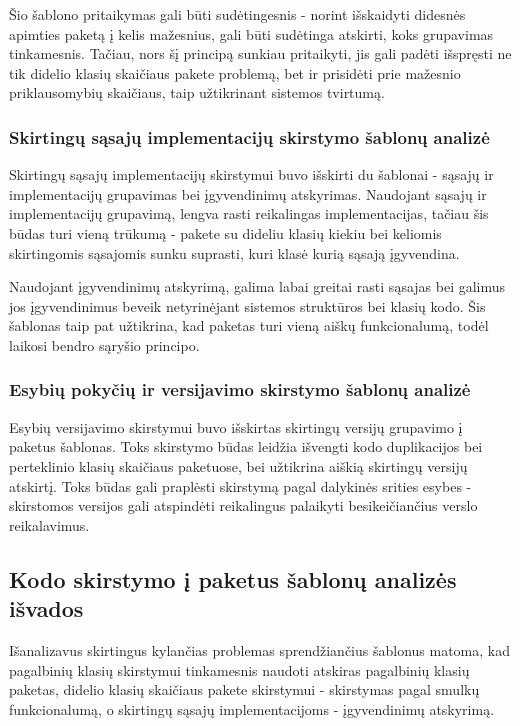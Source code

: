 Šio šablono pritaikymas gali būti sudėtingesnis - norint išskaidyti didesnės apimties paketą į kelis mažesnius, gali būti
sudėtinga atskirti, koks grupavimas tinkamesnis.
Tačiau, nors šį principą sunkiau pritaikyti, jis gali padėti išspręsti ne tik didelio klasių skaičiaus pakete problemą,
bet ir prisidėti prie mažesnio priklausomybių skaičiaus, taip užtikrinant sistemos tvirtumą.


\subsubsection{Skirtingų sąsajų implementacijų skirstymo šablonų analizė}
Skirtingų sąsajų implementacijų skirstymui buvo išskirti du šablonai - sąsajų ir implementacijų grupavimas bei
įgyvendinimų atskyrimas.
Naudojant sąsajų ir implementacijų grupavimą, lengva rasti reikalingas implementacijas, tačiau šis būdas
turi vieną trūkumą - pakete su dideliu klasių kiekiu bei keliomis skirtingomis sąsajomis sunku suprasti, kuri klasė kurią sąsają įgyvendina.

Naudojant įgyvendinimų atskyrimą, galima labai greitai rasti sąsajas bei galimus jos įgyvendinimus beveik netyrinėjant sistemos struktūros bei klasių kodo.
Šis šablonas taip pat užtikrina, kad paketas turi vieną aiškų funkcionalumą, todėl laikosi bendro sąryšio principo.

\subsubsection{Esybių pokyčių ir versijavimo skirstymo šablonų analizė}
Esybių versijavimo skirstymui buvo išskirtas skirtingų versijų grupavimo į paketus šablonas.
Toks skirstymo būdas leidžia išvengti kodo duplikacijos bei perteklinio klasių skaičiaus paketuose, bei užtikrina aiškią skirtingų versijų
atskirtį. Toks būdas gali praplėsti skirstymą pagal dalykinės srities esybes - skirstomos versijos gali atspindėti reikalingus
palaikyti besikeičiančius verslo reikalavimus.

\subsection{Kodo skirstymo į paketus šablonų analizės išvados}
Išanalizavus skirtingus kylančias problemas sprendžiančius šablonus matoma, kad
pagalbinių klasių skirstymui tinkamesnis naudoti atskiras pagalbinių klasių paketas,
didelio klasių skaičiaus pakete skirstymui - skirstymas pagal smulkų funkcionalumą,
o skirtingų sąsajų implementacijoms - įgyvendinimų atskyrimą.
